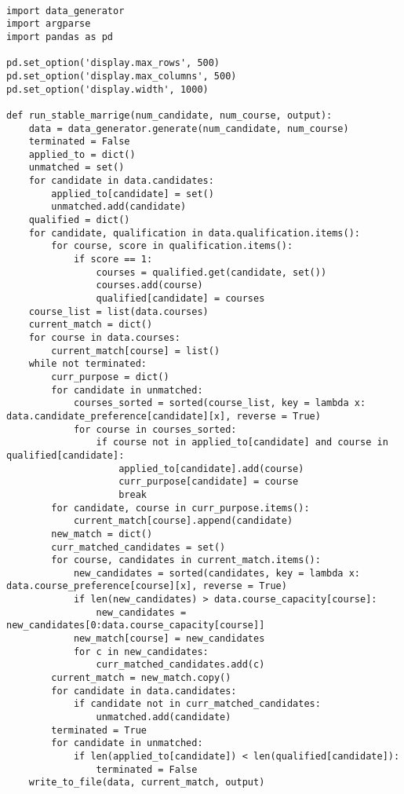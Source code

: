 \documentclass[twoside,twocolumn]{article}
\begin{document}
    \mbox{~}
    \clearpage
    \begin{appendices}
        \begin{verbatim}
import data_generator
import argparse
import pandas as pd

pd.set_option('display.max_rows', 500)
pd.set_option('display.max_columns', 500)
pd.set_option('display.width', 1000)

def run_stable_marrige(num_candidate, num_course, output):
    data = data_generator.generate(num_candidate, num_course)
    terminated = False
    applied_to = dict()
    unmatched = set()
    for candidate in data.candidates:
        applied_to[candidate] = set()
        unmatched.add(candidate)
    qualified = dict()
    for candidate, qualification in data.qualification.items():
        for course, score in qualification.items():
            if score == 1:
                courses = qualified.get(candidate, set())
                courses.add(course)
                qualified[candidate] = courses
    course_list = list(data.courses)
    current_match = dict()
    for course in data.courses:
        current_match[course] = list()
    while not terminated:
        curr_purpose = dict()
        for candidate in unmatched:
            courses_sorted = sorted(course_list, key = lambda x: data.candidate_preference[candidate][x], reverse = True)
            for course in courses_sorted:
                if course not in applied_to[candidate] and course in qualified[candidate]:
                    applied_to[candidate].add(course)
                    curr_purpose[candidate] = course
                    break
        for candidate, course in curr_purpose.items():
            current_match[course].append(candidate)
        new_match = dict()
        curr_matched_candidates = set()
        for course, candidates in current_match.items():
            new_candidates = sorted(candidates, key = lambda x: data.course_preference[course][x], reverse = True)
            if len(new_candidates) > data.course_capacity[course]:
                new_candidates = new_candidates[0:data.course_capacity[course]]
            new_match[course] = new_candidates
            for c in new_candidates:
                curr_matched_candidates.add(c)
        current_match = new_match.copy()
        for candidate in data.candidates:
            if candidate not in curr_matched_candidates:
                unmatched.add(candidate)
        terminated = True
        for candidate in unmatched:
            if len(applied_to[candidate]) < len(qualified[candidate]):
                terminated = False
    write_to_file(data, current_match, output)


\end{verbatim}
\end{appendices}
\end{document}
